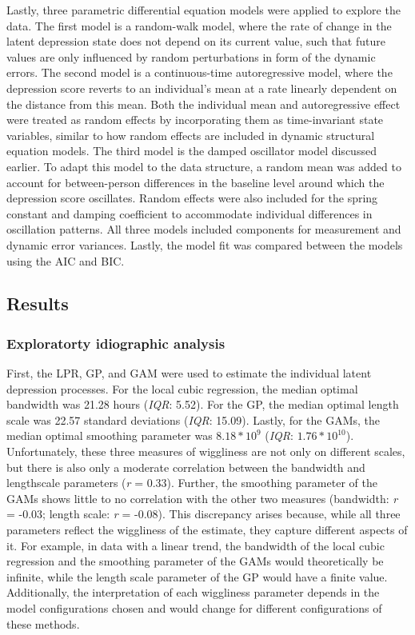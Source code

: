 \documentclass[man, floatsintext]{apa7}
\begin{document}
Lastly, three parametric differential equation models were applied to explore
the data. The first model is a random-walk model, where the rate of change in
the latent depression state does not depend on its current value, such that
future values are only influenced by random perturbations in form of the
dynamic errors.
The second model is a continuous-time autoregressive model, where the
depression score reverts to an individual's mean at a rate linearly dependent
on the distance from this mean. Both the individual mean and autoregressive
effect were treated as random effects by incorporating them as time-invariant
state variables, similar to how random effects are included
in dynamic structural equation models.
The third model is the damped oscillator model discussed earlier. To adapt this
model to the data structure, a random mean was added to account for
between-person differences in the baseline level around which the depression
score oscillates. Random effects were also included for the spring constant
and damping coefficient to accommodate individual differences in oscillation
patterns. All three models included components for measurement and dynamic
error variances. Lastly, the model fit was compared between the models
using the AIC and BIC\@.

\subsection{Results}

\subsubsection{Exploratorty idiographic analysis}

First, the LPR, GP, and GAM were used to
estimate the individual latent depression processes. For the local cubic
regression, the median optimal bandwidth was 21.28 hours (\textit{IQR}: 5.52).
For the GP, the median optimal length scale was 22.57 standard deviations
(\textit{IQR}: 15.09). Lastly, for the GAMs, the median optimal smoothing
parameter was $8.18*10^9$ (\textit{IQR}: $1.76*10^{10}$). Unfortunately, these
three measures of wiggliness are not only on different scales, but there is
also only a moderate correlation between the bandwidth and lengthscale
parameters (\textit{r} = 0.33). Further, the smoothing parameter of the GAMs
shows
little to no correlation with the other two measures (bandwidth: \textit{r} =
-0.03; length scale: \textit{r} = -0.08). This discrepancy arises because,
while all three parameters reflect the wiggliness of the estimate, they capture
different aspects of it. For example, in data with a linear trend, the
bandwidth of the local cubic regression and the smoothing parameter of the GAMs
would theoretically be infinite, while the length scale parameter of the GP
would have a finite value. Additionally, the interpretation of each
wiggliness parameter depends in the model configurations chosen and would
change for different configurations of these methods.
\end{document}
